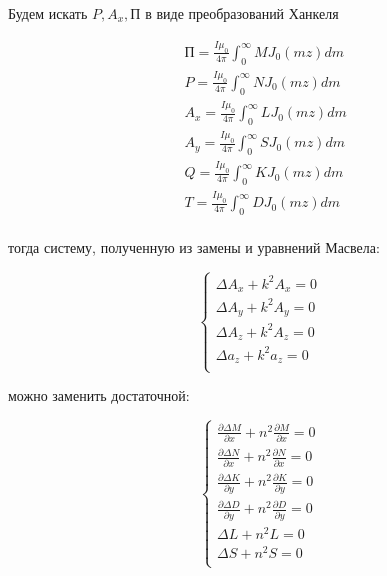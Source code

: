 	Будем искать $P, A_x, \text{П}$ в виде преобразований Ханкеля
	
	\begin{equation}
		\begin{aligned}
			& \text{П} = \frac{I \mu_0}{4 \pi} \int_0^{\infty} M J_0(mz) dm \\
			& P = \frac{I \mu_0}{4 \pi} \int_0^{\infty} N J_0(mz) dm \\
			& A_x = \frac{I \mu_0}{4 \pi} \int_0^{\infty} L J_0(mz) dm \\
			& A_y = \frac{I \mu_0}{4 \pi} \int_0^{\infty} S J_0(mz) dm \\
			& Q = \frac{I \mu_0}{4 \pi} \int_0^{\infty} K J_0(mz) dm \\
			& T = \frac{I \mu_0}{4 \pi} \int_0^{\infty} D J_0(mz) dm \\
		\end{aligned}
	\end{equation} 
	
	тогда систему, полученную из замены и уравнений Масвела:
	
	\begin{equation}
		\begin{cases}
			\Delta A_x + k^2 A_x = 0 \\
			\Delta A_y + k^2 A_y = 0 \\
			\Delta A_z + k^2 A_z = 0 \\
			\Delta a_z + k^2 a_z = 0 \\
		\end{cases}
	\end{equation}
	
	можно заменить достаточной:
	
	\begin{equation}
		\begin{cases}
			 \frac{\partial \Delta M}{\partial x} + n^2 \frac{\partial M}{\partial x} = 0 \\
			 \frac{\partial \Delta N}{\partial x} + n^2 \frac{\partial N}{\partial x} = 0 \\
			 \frac{\partial \Delta K}{\partial y} + n^2 \frac{\partial K}{\partial y} = 0 \\
			 \frac{\partial \Delta D}{\partial y} + n^2 \frac{\partial D}{\partial y} = 0 \\
			 \Delta L + n^2 L = 0 \\
			 \Delta S + n^2 S = 0 \\
		\end{cases}
	\end{equation}
	
